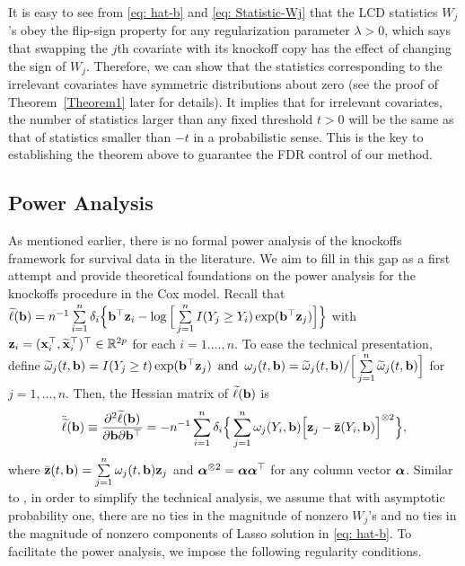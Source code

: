 \documentclass[11pt]{article}
\def\bx{{\bf x}}
\def\bz{{\bf z}}
\def\bb{{\bf b}}
\newcommand{\balpha}{\mbox{\boldmath $\alpha$}}
\begin{document}
It is easy to see from \eqref{eq: hat-b} and \eqref{eq: Statistic-Wj} that the LCD statistics $W_j$'s obey the flip-sign property for any regularization parameter $\lambda>0$, which says that swapping the $j$th covariate with its knockoff copy has the effect of changing the sign of $W_j$.  
Therefore, we can show that
the statistics corresponding to the irrelevant covariates have symmetric distributions about zero (see the proof of Theorem~\ref{Theorem1} later for details). It implies that for irrelevant covariates, the number
of statistics larger than any fixed threshold $t>0$ will be the same as that of statistics smaller than $-t$ in a probabilistic sense. This is the key to establishing the theorem above to guarantee the FDR control of our method.


\subsection{Power Analysis}

As mentioned earlier, there is no formal power analysis of the knockoffs framework for survival data in the literature. We aim to fill in this gap as a first attempt and provide theoretical foundations on the power
analysis for the knockoffs procedure in the Cox model.
Recall that $	\widetilde{\ell}(\bb)=n^{-1}\sum\limits_{i=1}^{n}\delta_i
\Big\{\bb^{\top}\bz_i-\log\Big[\sum\limits_{j=1}^{n}I(Y_j\geq Y_i) \exp(\bb^{\top}\bz_j)\Big] \Big\}$  with
$\bz_i=(\bx_i^{\top}, \widetilde{\bx}_i^{\top})^{\top}\in\mathbb{R}^{2p}$ for each $i=1. \ldots, n$. To ease the technical presentation, 
define
$\widetilde{\omega}_j(t, \bb)=I(Y_j\geq t)\exp(\bb^{\top}\bz_j)\,\,\,
\mbox{and}\,\,\,
\omega_j(t, \bb)=\widetilde{\omega}_j(t, \bb)/\Big[\sum\limits_{j=1}^n\widetilde{\omega}_j(t, \bb)\Big]$
for $j=1, \ldots, n$. 
Then, the Hessian matrix of 
$\widetilde{\ell}(\bb)$ is
\begin{align*}
\ddot{\widetilde{\ell}}(\bb) 
\equiv \frac{\partial^{2} \widetilde{\ell}(\bb)}{\partial \bb\partial \bb^{\top}}
=-n^{-1}\sum_{i=1}^n\delta_i
\Big\{\sum_{j=1}^n\omega_j(Y_i, \bb)\Big[\bz_j-\bar{\bz}(Y_i, \bb)\Big]^{\otimes 2}\Big\}, 
\end{align*}
where $\bar{\bz}(t, \bb)=\sum\limits_{j=1}^n\omega_j(t, \bb)\bz_j$ and $\balpha^{\otimes 2}=\balpha\balpha^{\top}$ for any column vector $\balpha$. 
Similar to \cite{fan2020rank}, in order to simplify the technical analysis, we assume that with asymptotic probability one, there are no ties in the magnitude of nonzero $W_j$'s and no ties in the magnitude of nonzero components of Lasso solution in \eqref{eq: hat-b}. To facilitate the power analysis, we impose the following regularity conditions.
\end{document}
